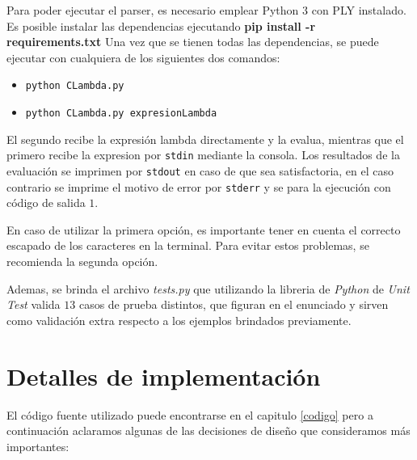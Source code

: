 \documentclass{article}
\theoremstyle{definition}
\theoremstyle{remark}
\begin{document}
Para poder ejecutar el parser, es necesario emplear Python 3 con PLY instalado. Es posible instalar las dependencias ejecutando \textbf{pip install -r requirements.txt }Una vez que se tienen todas las dependencias, se puede ejecutar con cualquiera de los siguientes dos comandos:

\begin{itemize}
	\item \texttt{python CLambda.py}
	\item \texttt{python CLambda.py expresionLambda}
\end{itemize}

El segundo recibe la expresión lambda directamente y la evalua, mientras que el primero recibe la expresion por \texttt{stdin} mediante la consola. Los resultados de la evaluación se imprimen por \texttt{stdout} en caso de que sea satisfactoria, en el caso contrario se imprime el motivo de error por \texttt{stderr} y se para la ejecución con código de salida $1$.

En caso de utilizar la primera opción, es importante tener en cuenta el correcto escapado de los caracteres en la terminal. Para evitar estos problemas, se recomienda la segunda opción.

Ademas, se brinda el archivo \emph{tests.py} que utilizando la libreria de \emph{Python} de \emph{Unit Test} valida $13$ casos de prueba distintos, que figuran en el enunciado y sirven como validación extra respecto a los ejemplos brindados previamente. 

\section{Detalles de implementación}

El código fuente utilizado puede encontrarse en el capitulo \ref{codigo} pero a continuación aclaramos algunas de las decisiones de diseño que consideramos más importantes:
\end{document}

